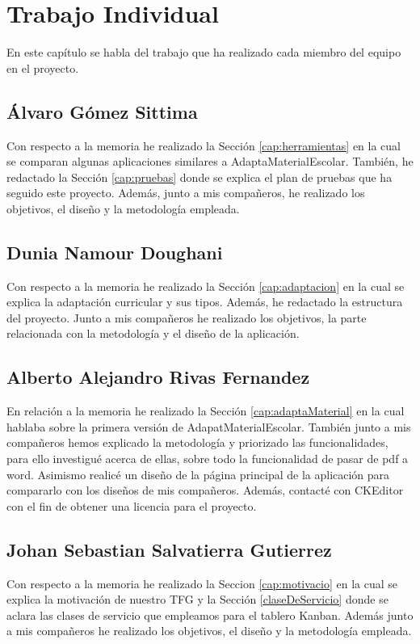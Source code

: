 \chapter{Trabajo Individual}
\label{cap:TrabajoIndividual}

En este capítulo se habla del trabajo que ha realizado cada miembro del equipo en el proyecto.

\section{Álvaro Gómez Sittima}
Con respecto a la memoria he realizado la Sección \ref{cap:herramientas} en la cual se comparan algunas aplicaciones similares a AdaptaMaterialEscolar. También, he redactado la Sección \ref{cap:pruebas} donde se explica el plan de pruebas que ha seguido este proyecto. Además, junto a mis compañeros, he realizado los objetivos, el diseño y la metodología empleada.

\section{Dunia Namour Doughani}
Con respecto a la memoria he realizado la Sección \ref{cap:adaptacion} en la cual se explica la adaptación curricular y sus tipos. Además, he redactado la estructura del proyecto. Junto a mis compañeros he realizado los objetivos, la parte relacionada con la metodología y el diseño de la aplicación.

\section{Alberto Alejandro Rivas Fernandez}
En relación a la memoria he realizado la Sección \ref{cap:adaptaMaterial} en la cual hablaba sobre la primera versión de AdapatMaterialEscolar. También junto a mis compañeros hemos explicado la metodología y priorizado las funcionalidades, para ello investigué acerca de ellas, sobre todo la funcionalidad de pasar de pdf a word. Asimismo realicé un diseño de la página principal de la aplicación para compararlo con los diseños de mis compañeros. Además, contacté con CKEditor con el fin de obtener una licencia para el proyecto.

\section{Johan Sebastian Salvatierra Gutierrez}
Con respecto a la memoria he realizado la Seccion \ref{cap:motivacio} en la cual se explica la motivación de nuestro TFG y la Sección \ref{claseDeServicio} donde se aclara las clases de servicio que empleamos para el tablero Kanban.
Además junto a mis compañeros he realizado los objetivos, el diseño y la metodología empleada.